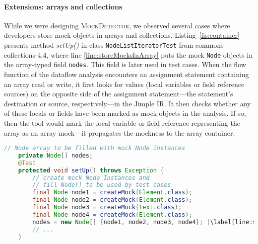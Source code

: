 \paragraph{Extensions: arrays and collections} While we were designing \textsc{MockDetector}, we observed several cases where developers store mock objects in arrays and collections. Listing~\ref{lis:container} presents method \textit{setUp()} in class \texttt{NodeListIteratorTest} from commons-collections-4.4, where line \ref{line:storeMocksInArray} puts the mock \texttt{Node} objects in the array-typed field \texttt{nodes}. This field is later used in test cases. When the flow function of the dataflow analysis encounters an assignment statement containing an array read or write, it first looks for values (local variables or field reference sources) on the opposite side of the assignment statement---the statement's destination or source, respectively---in the Jimple IR. It then checks whether any of these locals or fields have been marked as mock objects in the analysis. If so, then the tool would mark the local variable or field reference representing the array as an array mock---it propagates the mockness to the array container.

\begin{lstlisting}[basicstyle=\ttfamily, caption={This example illustrates a field array container holding mock \\ objects from \textit{setup()} in \texttt{NodeListIteratorTest.java}.},
basicstyle=\scriptsize\ttfamily,language = Java, framesep=4.5mm, framexleftmargin=1.0mm, captionpos=b, label=lis:container, escapechar=|, morekeywords={@Test}]
	// Node array to be filled with mock Node instances
	private Node[] nodes;
	@Test
	protected void setUp() throws Exception {
	    // create mock Node Instances and 
	    // fill Node[] to be used by test cases
	    final Node node1 = createMock(Element.class);
	    final Node node2 = createMock(Element.class);
	    final Node node3 = createMock(Text.class);
	    final Node node4 = createMock(Element.class);
	    nodes = new Node[] {node1, node2, node3, node4}; |\label{line:storeMocksInArray}|
	    // ...
	}
\end{lstlisting}

